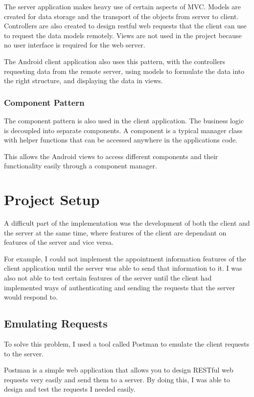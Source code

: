 The server application makes heavy use of certain aspects of MVC. Models are created for data storage and the transport of the objects from server to client. Controllers are also created to design restful web requests that the client can use to request the data models remotely. Views are not used in the project because no user interface is required for the web server.

The Android client application also uses this pattern, with the controllers requesting data from the remote server, using models to formulate the data into the right structure, and displaying the data in views.

\subsubsection{Component Pattern}

The component pattern is also used in the client application. The business logic is decoupled into separate components. A component is a typical manager class with helper functions that can be accessed anywhere in the applications code.

This allows the Android views to access different components and their functionality easily through a component manager.

\section{Project Setup}

A difficult part of the implementation was the development of both the client and the server at the same time, where features of the client are dependant on features of the server and vice versa.

For example, I could not implement the appointment information features of the client application until the server was able to send that information to it. I was also not able to test certain features of the server until the client had implemented ways of authenticating and sending the requests that the server would respond to.

\subsection{Emulating Requests}

To solve this problem, I used a tool called Postman to emulate the client requests to the server. 

Postman is a simple web application that allows you to design RESTful web requests very easily and send them to a server. By doing this, I was able to design and test the requests I needed easily.

